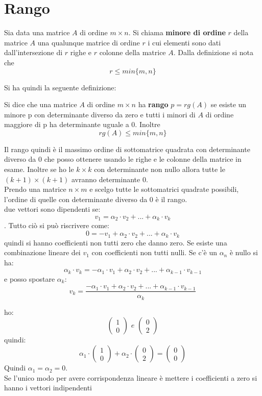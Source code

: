 \documentclass[a4paper,12pt, oneside]{book}
\begin{document}
\section{Rango}
\begin{definizione}
Sia data una matrice $A$ di ordine $m\times n$. Si chiama \textbf{minore di ordine} $r$ della matrice $A$ una qualunque matrice di ordine $r$ i cui elementi sono dati dall'intersezione di $r$ righe e $r$ colonne della matrice $A$. Dalla definizione si nota che $$r\leq min\{m,n\}$$
\end{definizione}
Si ha quindi la seguente definizione:
\begin{definizione}
Si dice che una matrice $A$ di ordine $m\times n$ ha \textbf{rango} $p=rg(A)$ se esiste un minore p con determinante diverso da zero e tutti i minori di $A$ di ordine maggiore di p ha determinante uguale a $0$. Inoltre 
$$rg(A)\leq min\{m,n\}$$
\end{definizione}
Il rango quindi è il massimo ordine di sottomatrice quadrata con determinante diverso da 0 che posso ottenere usando le righe e le colonne della matrice in esame. Inoltre se ho le $k\times k$ con determinante non nullo allora tutte le $(k+1)\times(k+1)$ avranno determinante 0.\\
Prendo una matrice $n\times m$ e scelgo tutte le sottomatrici quadrate possibili, l'ordine di quelle con determinante diverso da 0 è il rango.\\
due vettori sono dipendenti se: $$v_1=\alpha_2\cdot v_2+...+ \alpha_k\cdot v_k$$. Tutto ciò si può riscrivere come: $$0=-v_1+\alpha_2\cdot v_2+...+ \alpha_k\cdot v_k$$ quindi si hanno coefficienti non tutti zero che danno zero. Se esiste una combinazione lineare dei $v_1$ con coefficienti non tutti nulli. Se c'è un $\alpha_n$ è nullo si ha: $$\alpha_k\cdot v_k=-\alpha_1\cdot v_1+\alpha_2\cdot v_2+...+ \alpha_{k-1}\cdot v_{k-1}$$ e posso spostare $\alpha_ k$: $$v_k=\frac{-\alpha_1\cdot v_1+\alpha_2\cdot v_2+...+ \alpha_{k-1}\cdot v_{k-1}}{\alpha_k}$$ 
\begin{esempio}
ho:
$$\left(\begin{matrix}
1\\
0
\end{matrix}\right) \,\, e \,\, \left(\begin{matrix}
0\\
2
\end{matrix}\right)$$
quindi:
$$\alpha_1\cdot \left(\begin{matrix}
1\\
0
\end{matrix}\right) + \alpha_2\cdot \left(\begin{matrix}
0\\
2
\end{matrix}\right)=
\left(\begin{matrix}
0\\
0
\end{matrix}\right)$$
Quindi $\alpha_1=\alpha_2=0$.\\
Se l'unico modo per avere corrispondenza lineare è mettere i coefficienti a zero si hanno i vettori indipendenti
\end{esempio}
\end{document}
